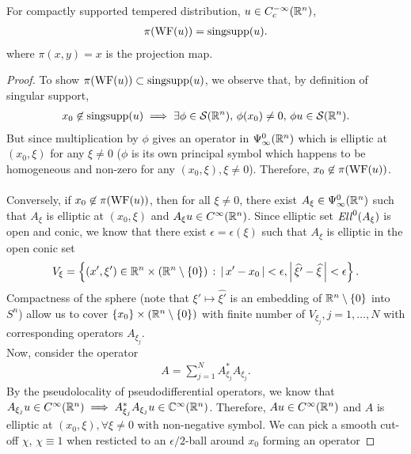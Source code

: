 \documentclass[12pt]{article}
\begin{document}
\begin{fprop}
    For compactly supported tempered distribution, $u \in C^{-\infty}_c({\mathbb R}^n)$, 
    \begin{align*}
        \pi(\mathrm{WF}(u)) = \mathrm{singsupp}(u). 
    \end{align*}
    where $\pi(x, y) = x$ is the projection map. 
\end{fprop}
\begin{proof}
    To show $\pi(\mathrm{WF}(u)) \subset \mathrm{singsupp}(u)$, we observe that, by definition of singular support, 
    \begin{align*}
        x_0 \not \in \mathrm{singsupp}(u) \implies \exists \phi \in \mathcal{S}({\mathbb R}^n), \, \phi(x_0) \neq 0, \, \phi u \in \mathcal{S}({\mathbb R}^n). 
    \end{align*}
    But since multiplication by $\phi$ gives an operator in $\Psi^0_\infty({\mathbb R}^n)$ which is elliptic at $(x_0, \xi)$ for any $\xi \neq 0$ ($\phi$ is its own principal symbol which happens to be homogeneous and non-zero for any $(x_0, \xi), \xi \neq 0$). Therefore, $x_0 \not \in \pi(\mathrm{WF}(u))$. \\
    \\
    Conversely, if $x_0 \not\in \pi(\mathrm{WF}(u))$, then for all $\xi \neq 0$, there exist $A_\xi \in \Psi^0_\infty({\mathbb R}^n)$ such that $A_\xi$ is elliptic at $(x_0, \xi)$ and $A_\xi u \in C^\infty({\mathbb R}^n)$. Since elliptic set $\mathit{Ell}^0(A_\xi)$ is open and conic, we know that there exist $\epsilon = \epsilon(\xi)$ such that $A_\xi$ is elliptic in the open conic set
    \begin{align*}
        V_\xi = \left\{(x', \xi')\in {\ensuremath {\mathbb R}}^n \times ({\mathbb R}^n \setminus \left\{0\right\}) \, : \, \left|\, x' - x_0\,\right| < \epsilon, \left|\, \widehat{\xi'} - \widehat{\xi}\,\right| < \epsilon \right\}. 
    \end{align*}
    Compactness of the sphere (note that $\xi' \mapsto \widehat{\xi'}$ is an embedding of ${\mathbb R}^n \setminus \left\{0\right\}$ into $S^n$) allow us to cover $\left\{x_0\right\} \times ({\mathbb R}^n \setminus \left\{0\right\})$ with finite number of $V_{\xi_j}, j = 1, \dots, N$ with corresponding operators $A_{\xi_j}$. \\
    Now, consider the operator
    \begin{align*}
        A = \sum_{j = 1}^N A^*_{\xi_j}A_{\xi_j}. 
    \end{align*}
    By the pseudolocality of pseudodifferential operators, we know that $A_{\xi_j} u \in C^\infty({\mathbb R}^n) \implies A^*_{\xi_j} A_{\xi_j} u \in {\ensuremath {\mathbb C}}^\infty({\mathbb R}^n)$. Therefore, $Au \in C^\infty({\mathbb R}^n)$ and $A$ is elliptic at $(x_0, \xi), \forall \xi \neq 0$ with non-negative symbol. We can pick a smooth cut-off $\chi$, $\chi \equiv 1$ when resticted to an $\epsilon/2$-ball around $x_0$ forming an operator

\end{proof}
\end{document}

